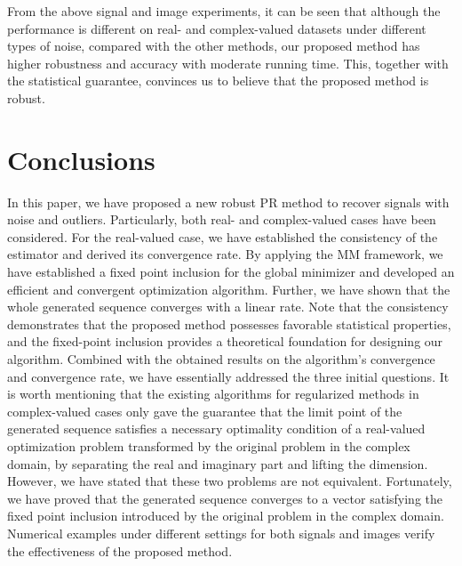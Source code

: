 \documentclass{article}
\numberwithin{equation}{section}
\begin{document}
From the above signal and image experiments, it can be seen that although the performance is different on real- and complex-valued datasets under different types of noise, compared with the other methods, our proposed method has higher robustness and accuracy with moderate running time. This, together with the statistical guarantee, convinces us to believe that the proposed method is robust.


 
 

\section{Conclusions}\label{conclusion}

In this paper, we have proposed a new robust PR method to recover signals with noise and outliers. Particularly, both real- and complex-valued cases have been considered. For the real-valued case, we have established the consistency of the estimator and derived its convergence rate. By applying the MM framework, we have established a fixed point inclusion for the global minimizer and  developed an efficient and convergent optimization algorithm. Further, we have shown that the whole generated sequence converges with a linear rate. Note that the consistency demonstrates that the proposed method possesses favorable statistical properties, and the fixed-point inclusion provides a theoretical foundation for designing our algorithm. Combined with the obtained results on the algorithm's convergence and convergence rate, we have essentially addressed the three initial questions. It is worth mentioning that the existing algorithms for regularized methods in complex-valued cases only gave the guarantee that the limit point of the generated sequence satisfies a necessary optimality condition of a real-valued optimization problem transformed by the original problem in the complex domain, by separating the real and imaginary part and lifting the dimension. However, we have stated that these two problems are not equivalent. Fortunately, we have proved that  the generated sequence converges to a vector satisfying the fixed point inclusion introduced by the original problem in the complex domain. Numerical examples under different settings for both signals and images verify the effectiveness of the proposed method.
\end{document}
